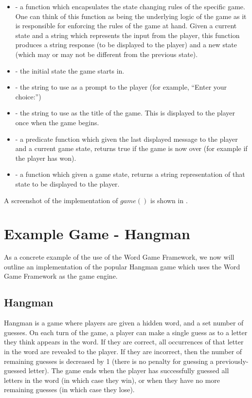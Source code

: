 \begin{itemize}
	\item {} - a function which encapsulates the state changing rules of the specific game.  One can think of this function as being the underlying logic of the game as it is responsible for enforcing the rules of the game at hand.  Given a current state and a string which represents the input from the player, this function produces a string response (to be displayed to the player) and a new state (which may or may not be different from the previous state).
	\item {} - the initial state the game starts in.
	\item {} - the string to use as a prompt to the player (for example, ``Enter your choice:'')
	\item {} - the string to use as the title of the game.  This is displayed to the player once when the game begins.
	\item {} - a predicate function which given the last displayed message to the player and a current game state, returns true if the game is now over (for example if the player has won).
	\item {} - a function which given a game state, returns a string representation of that state to be displayed to the player.
\end{itemize}

A screenshot of the implementation of \(game()\) is shown in .


\section{Example Game - Hangman}
\label{hangmanImplDetails}

As a concrete example of the use of the Word Game Framework, we now will outline an implementation of the popular Hangman game which uses the Word Game Framework as the game engine.

\subsection{Hangman}

Hangman is a game where players are given a hidden word, and a set number of guesses.  On each turn of the game, a player can make a single guess as to a letter they think appears in the word.  If they are correct, all occurrences of that letter in the word are revealed to the player.  If they are incorrect, then the number of remaining guesses is decreased by 1 (there is no penalty for guessing a previously-guessed letter).  The game ends when the player has successfully guessed all letters in the word (in which case they win), or when they have no more remaining guesses (in which case they lose).

